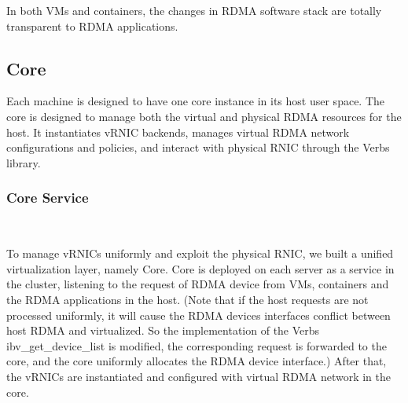 In both VMs and containers, the changes in RDMA software stack are totally transparent to RDMA applications.

\subsection{\sys Core}

Each machine is designed to have one \sys core instance in its host user space. The \sys core is designed to manage both the virtual and physical RDMA resources for the host. It instantiates vRNIC backends, manages virtual RDMA network configurations and policies, and interact with physical RNIC through the Verbs library.



\subsubsection{\textbf{\sys Core Service}}
\
\noindent


To manage vRNICs uniformly and exploit the physical RNIC, we built a unified virtualization layer, namely \sys Core. \sys Core is deployed on each server as a service in the cluster, listening to the request of RDMA device from VMs, containers and the RDMA applications in the host. (Note that if the host requests are not processed uniformly, it will cause the RDMA devices interfaces conflict between host RDMA and virtualized. So the implementation of the Verbs ibv\_get\_device\_list is modified, the corresponding request is forwarded to the \sys core, and the \sys core uniformly allocates the RDMA device interface.) After that, the vRNICs are instantiated and configured with virtual RDMA network in the \sys core.


